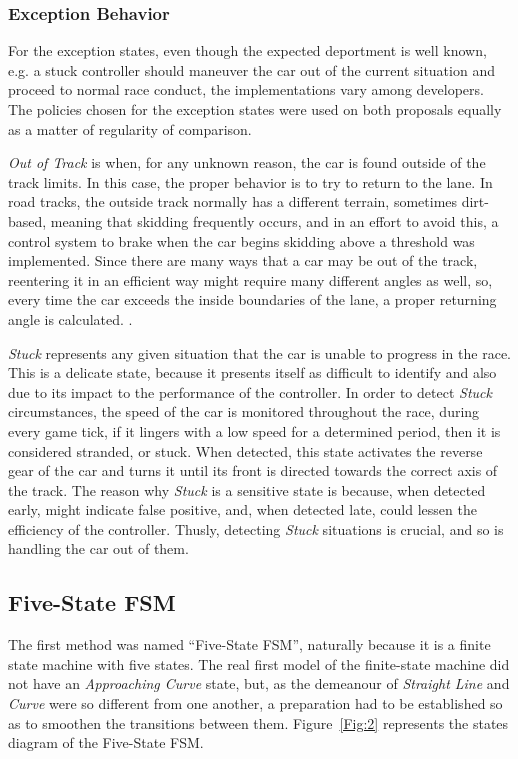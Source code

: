 \subsubsection{Exception Behavior}
	
	For the exception states, even though the expected deportment is well known, e.g. a stuck controller should maneuver the car out of the current situation and proceed to normal race conduct, the implementations vary among developers. The policies chosen for the exception states were used on both proposals equally as a matter of regularity of comparison.
	
	\emph{Out of Track} is when, for any unknown reason, the car is found outside of the track limits. In this case, the proper behavior is to try to return to the lane. In road tracks, the outside track normally has a different terrain, sometimes dirt-based, meaning that skidding frequently occurs, and in an effort to avoid this, a control system to brake when the car begins skidding above a threshold was implemented. Since there are many ways that a car may be out of the track, reentering it in an efficient way might require many different angles as well, so, every time the car exceeds the inside boundaries of the lane, a proper returning angle is calculated. .
	
	\emph{Stuck} represents any given situation that the car is unable to progress in the race. This is a delicate state, because it presents itself as difficult to identify and also due to its impact to the performance of the controller. In order to detect \emph{Stuck} circumstances, the speed of the car is monitored throughout the race, during every game tick, if it lingers with a low speed for a determined period, then it is considered stranded, or stuck. When detected, this state activates the reverse gear of the car and turns it until its front is directed towards the correct axis of the track. The reason why \emph{Stuck} is a sensitive state is because, when detected early, might indicate false positive, and, when detected late, could lessen the efficiency of the controller. Thusly, detecting \textit{Stuck} situations is crucial, and so is handling the car out of them.
	
\subsection{Five-State FSM} \label{subsec:FSM5}

	The first method was named ``Five-State FSM'', naturally because it is a finite state machine with five states. The real first model of the finite-state machine did not have an \emph{Approaching Curve} state, but, as the demeanour of \emph{Straight Line} and \emph{Curve} were so different from one another, a preparation had to be established so as to smoothen the transitions between them. Figure~\ref{Fig:2} represents the states diagram of the Five-State FSM.
	
